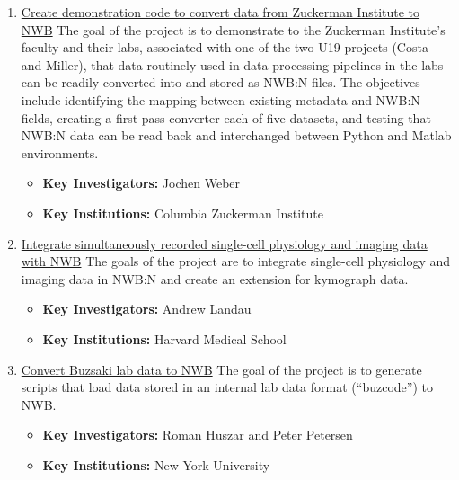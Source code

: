 \documentclass{article}
\begin{document}
\begin{enumerate}
    \item \href{https://neurodatawithoutborders.github.io/nwb_hackathons/HCK06_2019_Janelia/projects/Zuckerman2NWB/}{Create demonstration code to convert data from Zuckerman Institute to NWB} The goal of the project is to demonstrate to the Zuckerman Institute’s faculty and their labs, associated with one of the two U19 projects (Costa and Miller), that data routinely used in data processing pipelines in the labs can be readily converted into and stored as NWB:N files. The objectives include identifying the mapping between existing metadata and NWB:N fields, creating a first-pass converter each of five datasets, and testing that NWB:N data can be read back and interchanged between Python and Matlab environments.
        \vspace{-0.2cm}
        \begin{itemize}[noitemsep]
            \item \textbf{Key Investigators:} Jochen Weber
            \item \textbf{Key Institutions:} Columbia Zuckerman Institute
        \end{itemize}
        
    \item \href{https://neurodatawithoutborders.github.io/nwb_hackathons/HCK06_2019_Janelia/projects/singleCell_PhysiologyImaging/}{Integrate simultaneously recorded single-cell physiology and imaging data with NWB} The goals of the project are to integrate single-cell physiology and imaging data in NWB:N and create an extension for kymograph data.
        \vspace{-0.2cm}
        \begin{itemize}[noitemsep]
            \item \textbf{Key Investigators:} Andrew Landau
            \item \textbf{Key Institutions:} Harvard Medical School
        \end{itemize}
        
    \item \href{https://neurodatawithoutborders.github.io/nwb_hackathons/HCK06_2019_Janelia/projects/BuzsakiLab2NWB/}{Convert Buzsaki lab data to NWB} The goal of the project is to generate scripts that load data stored in an internal lab data format (“buzcode”) to NWB.
        \vspace{-0.2cm}
        \begin{itemize}[noitemsep]
            \item \textbf{Key Investigators:} Roman Huszar and Peter Petersen
            \item \textbf{Key Institutions:} New York University
        \end{itemize}
        

\end{enumerate}
\end{document}
